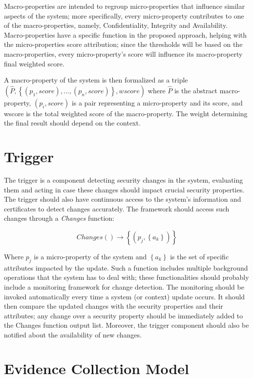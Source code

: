 Macro-properties are intended to regroup micro-properties that influence similar aspects of the system; more specifically, every micro-property contributes to one of the macro-properties, namely, Confidentiality, Integrity and Availability. Macro-properties have a specific function in the proposed approach, helping with the micro-properties score attribution; since the thresholds will be based on the macro-properties, every micro-property's score will influence its macro-property final weighted score.

A macro-property of the system is then formalized as a triple \\ \( \left ( \hat{P}, \left \{(p_1, score), \dots , (p_n, score )\right \}, wscore \right ) \)
where \(\hat{P}\) is the abstract macro-property, \( \left (p_i, score \right ) \) is a pair representing a micro-property and its score, and wscore is the total weighted score of the macro-property. The weight determining the final result should depend on the context. 




\section{Trigger}
\label{trigger}
The trigger is a component detecting security changes in the system, evaluating them and acting in case these changes should impact crucial security properties. The trigger should also have continuous access to the system's information and certificates to detect changes accurately. The framework should access such changes through a \textit{Changes} function: 

\[Changes() \rightarrow \left \{ \left ( p_j, \left \{ a_k \right \} \right ) \right \} \]

Where \(p_j\) is a micro-property of the system and \( \left \{a_k \right \} \) is the set of specific attributes impacted by the update. Such a function includes multiple background operations that the system has to deal with; these functionalities should probably include a monitoring framework for change detection. The monitoring should be invoked automatically every time a system (or context) update occurs. It should then compare the updated changes with the security properties and their attributes; any change over a security property should be immediately added to the Changes function output list. Moreover, the trigger component should also be notified about the availability of new changes.


\section{Evidence Collection Model}

